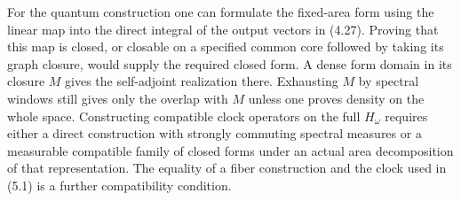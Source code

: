 \documentclass[11pt]{article}
\begin{document}
For the quantum construction one can formulate the fixed-area form using the linear map into the direct integral of the output vectors in (4.27). Proving that this map is closed, or closable on a specified common core followed by taking its graph closure, would supply the required closed form. A dense form domain in its closure $M$ gives the self-adjoint realization there. Exhausting $M$ by spectral windows still gives only the overlap with $M$ unless one proves density on the whole space. Constructing compatible clock operators on the full $H_\omega$ requires either a direct construction with strongly commuting spectral measures or a measurable compatible family of closed forms under an actual area decomposition of that representation. The equality of a fiber construction and the clock used in (5.1) is a further compatibility condition.
\end{document}
